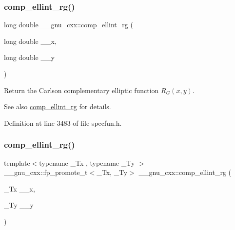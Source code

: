 \subsubsection{\texorpdfstring{comp\+\_\+ellint\+\_\+rg()}{comp\_ellint\_rg()}\hspace{0.1cm}{\footnotesize\ttfamily [2/3]}}
{\footnotesize\ttfamily long double \+\_\+\+\_\+gnu\+\_\+cxx\+::comp\+\_\+ellint\+\_\+rg (\begin{DoxyParamCaption}\item[{long double}]{\+\_\+\+\_\+x,  }\item[{long double}]{\+\_\+\+\_\+y }\end{DoxyParamCaption})\hspace{0.3cm}{\ttfamily [inline]}}

Return the Carlson complementary elliptic function $ R_G(x,y) $.

\begin{DoxySeeAlso}{See also}
\hyperlink{group__gnu__math__spec__func_ga978f8eec6e5edc918b243925dbacb65b}{comp\+\_\+ellint\+\_\+rg} for details. 
\end{DoxySeeAlso}


Definition at line 3483 of file specfun.\+h.

\mbox{\label{group__gnu__math__spec__func_ga389b1ef6cad1e33c1120665a4b915642}} 
\subsubsection{\texorpdfstring{comp\+\_\+ellint\+\_\+rg()}{comp\_ellint\_rg()}\hspace{0.1cm}{\footnotesize\ttfamily [3/3]}}
{\footnotesize\ttfamily template$<$typename \+\_\+\+Tx , typename \+\_\+\+Ty $>$ \\
\+\_\+\+\_\+gnu\+\_\+cxx\+::fp\+\_\+promote\+\_\+t$<$\+\_\+\+Tx, \+\_\+\+Ty$>$ \+\_\+\+\_\+gnu\+\_\+cxx\+::comp\+\_\+ellint\+\_\+rg (\begin{DoxyParamCaption}\item[{\+\_\+\+Tx}]{\+\_\+\+\_\+x,  }\item[{\+\_\+\+Ty}]{\+\_\+\+\_\+y }\end{DoxyParamCaption})\hspace{0.3cm}{\ttfamily [inline]}}


